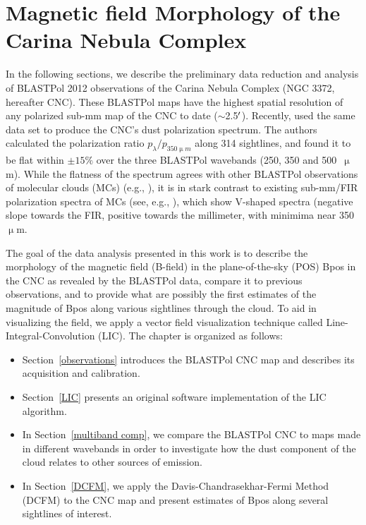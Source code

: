 \chapter{Magnetic field Morphology of the Carina Nebula Complex}\label{carina}

In the following sections, we describe the preliminary data reduction and analysis of BLASTPol 2012 \citep{galitzki2014balloon} observations of the Carina Nebula Complex (NGC 3372, hereafter CNC). These BLASTPol maps have the highest spatial resolution of any polarized sub-mm map of the CNC to date ($\sim$2.5$\operatorname{^{\prime}}$). Recently, \citet{shariff2015polarimetry} used the same data set to produce the CNC's dust polarization spectrum. The authors calculated the polarization ratio $p_\lambda/p_{350\upmu m}$ along 314 sightlines, and found it to be flat within $\pm 15\%$ over the three BLASTPol wavebands (250, 350 and 500~$\upmu$m). While the flatness of the spectrum agrees with other BLASTPol observations of molecular clouds (MCs) (e.g., \citet{ashton2018first,gandilo2016submillimeter}), it is in stark contrast to existing sub-mm/FIR polarization spectra of MCs (see, e.g., \citet{vaillancourt2012submillimeter}), which show V-shaped spectra (negative slope towards the FIR, positive towards the millimeter, with minimima near 350~$\upmu$m.

The goal of the data analysis presented in this work is to describe the morphology of the magnetic field (B-field) in the plane-of-the-sky (POS) \gls{Bpos} in the CNC as revealed by the BLASTPol data, compare it to previous observations, and to provide what are possibly the first estimates of the magnitude of \gls{Bpos} along various sightlines through the cloud. To aid in visualizing the field, we apply a vector field visualization technique called Line-Integral-Convolution (LIC). The chapter is organized as follows:

\begin{itemize}[nosep]
  \item Section~\ref{observations} introduces the BLASTPol CNC map and describes its acquisition and calibration.
  \item Section~\ref{LIC} presents an original software implementation of the LIC algorithm.
  \item In Section~\ref{multiband comp}, we compare the BLASTPol CNC to maps made in different wavebands in order to investigate how the dust component of the cloud relates to other sources of emission.
  \item In Section~\ref{DCFM}, we apply the Davis-Chandrasekhar-Fermi Method (DCFM) to the CNC map and present estimates of \gls{Bpos} along several sightlines of interest.
\end{itemize}

